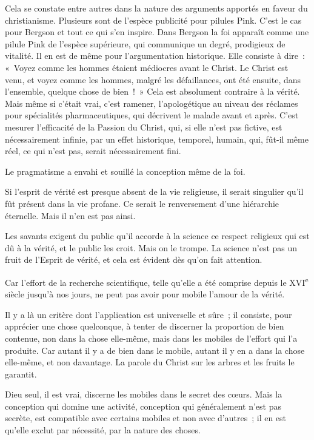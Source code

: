\documentclass[french,twoside]{book} %
\begin{document}
Cela se constate entre autres dans la nature des arguments apportés en faveur du christianisme. Plusieurs sont de l'espèce publicité pour pilules Pink. C'est le cas pour Bergson et tout ce qui s'en inspire. Dans Bergson la foi apparaît comme une pilule Pink de l'espèce supérieure, qui communique un degré, prodigieux de vitalité. Il en est de même pour l'argumentation historique. Elle consiste à dire : « Voyez comme les hommes étaient médiocres avant le Christ. Le Christ est venu, et voyez comme les hommes, malgré les défaillances, ont été ensuite, dans l'ensemble, quelque chose de bien ! » Cela est absolument contraire à la vérité. Mais même si c'était vrai, c'est ramener, l'apologétique au niveau des réclames pour spécialités pharmaceutiques, qui décrivent le malade avant et après. C'est mesurer l'efficacité de la Passion du Christ, qui, si elle n'est pas fictive, est nécessairement infinie, par un effet historique, temporel, humain, qui, fût-il même réel, ce qui n’est pas, serait nécessairement fini.\par
Le pragmatisme a envahi et souillé la conception même de la foi.\par
Si l'esprit de vérité est presque absent de la vie religieuse, il serait singulier qu'il fût présent dans la vie profane. Ce serait le renversement d'une hiérarchie éternelle. Mais il n'en est pas ainsi.\par
Les savants exigent du public qu'il accorde à la science ce respect religieux qui est dû à la vérité, et le public les croit. Mais on le trompe. La science n'est pas un fruit de l'Esprit de vérité, et cela est évident dès qu'on fait attention.\par
Car l'effort de la recherche scientifique, telle qu'elle a été comprise depuis le XVI\textsuperscript{e} siècle jusqu'à nos jours, ne peut pas avoir pour mobile l'amour de la vérité.\par
Il y a là un critère dont l'application est universelle et sûre ; il consiste, pour apprécier une chose quelconque, à tenter de discerner la proportion de bien contenue, non dans la chose elle-même, mais dans les mobiles de l'effort qui l'a produite. Car autant il y a de bien dans le mobile, autant il y en a dans la chose elle-même, et non davantage. La parole du Christ sur les arbres et les fruits le garantit.\par
Dieu seul, il est vrai, discerne les mobiles dans le secret des cœurs. Mais la conception qui domine une activité, conception qui généralement n'est pas secrète, est compatible avec certains mobiles et non avec d'autres ; il en est qu'elle exclut par nécessité, par la nature des choses.\par
\end{document}
